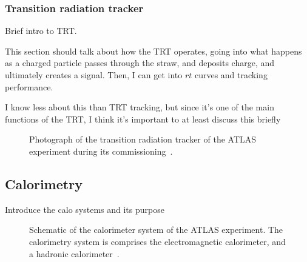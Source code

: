 \FloatBarrier
\subsubsection{Transition radiation tracker} 

{\color{red} Brief intro to TRT. }

{\color{red}This section should talk about how the TRT operates, going into
  what happens as a charged particle passes through the straw, and deposits
  charge, and ultimately creates a signal. Then, I can get into $rt$ curves
  and tracking performance.}

{\color{red}I know less about this than TRT tracking, but since it's one of the
  main functions of the TRT, I think it's important to at least discuss this
    briefly}

\begin{figure}[ht]
  \caption{
    Photograph of the transition radiation tracker of the ATLAS
    experiment during its commissioning~\cite{Maximilien:889555}.
  }
  \label{fig:trt_module}
\end{figure}

\FloatBarrier
\subsection{Calorimetry} 

{\color{red} Introduce the calo systems and its purpose}

\begin{figure}[ht]
  \caption[
    Schematic of the calorimeter system of the ATLAS
    experiment~\cite{cern-jinst-atlas}.
  ]{
    Schematic of the calorimeter system of the ATLAS
    experiment.
    The calorimetry system is comprises the electromagnetic calorimeter,
    and a hadronic calorimeter~\cite{cern-jinst-atlas}.
  }
  \label{fig:calo_cartoon}
\end{figure}


